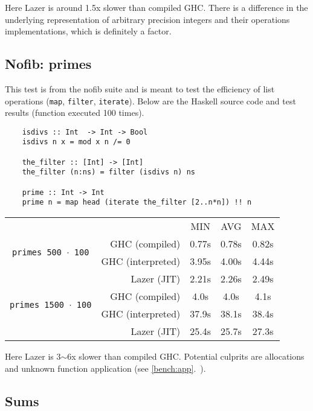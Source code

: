 \documentclass[en]{pracamgr}
\newcommand{\myref}[1]{\ref{#1}.~\textit{\nameref{#1}}}
\begin{document}
Here Lazer is around 1.5x slower than compiled GHC.
There is a difference in the underlying representation
of arbitrary precision integers and their operations
implementations, which is definitely a factor.

\subsection{Nofib: primes}

This test is from the nofib suite and is meant to test
the efficiency of list operations 
(\texttt{map}, \texttt{filter}, \texttt{iterate}).
Below are the Haskell source code and test results (function executed 100 times).

\begin{verbatim}
    isdivs :: Int  -> Int -> Bool
    isdivs n x = mod x n /= 0
    
    the_filter :: [Int] -> [Int]
    the_filter (n:ns) = filter (isdivs n) ns
    
    prime :: Int -> Int
    prime n = map head (iterate the_filter [2..n*n]) !! n
\end{verbatim}

\begin{center}
\begin{tabular}{c r c c c}
    & & MIN & AVG & MAX \\
    \cline{3-5}

    \multirow{2}{*}{\texttt{primes 500 $\cdot$ 100}}
    & GHC (compiled)& 0.77s & 0.78s & 0.82s \\
    & GHC (interpreted)& 3.95s & 4.00s & 4.44s \\
    & Lazer (JIT)& 2.21s & 2.26s & 2.49s \\
    \cline{2-5}

    \multirow{2}{*}{\texttt{primes 1500 $\cdot$ 100}}
    & GHC (compiled)& 4.0s & 4.0s & 4.1s \\
    & GHC (interpreted)& 37.9s & 38.1s & 38.4s \\
    & Lazer (JIT)& 25.4s & 25.7s & 27.3s \\
\end{tabular}
\end{center}

Here Lazer is 3$\sim$6x slower than compiled GHC.
Potential culprits are allocations and unknown function
application (see \myref{bench:app}).

\subsection{Sums}
\end{document}
